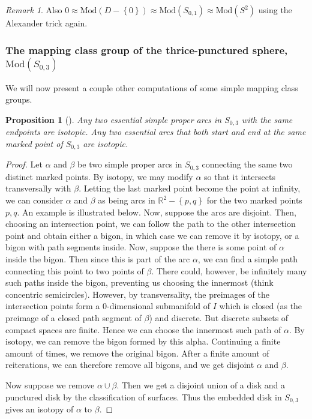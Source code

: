 \documentclass[reqno]{amsart}
\newtheorem{proposition}[theorem]{Proposition}
\theoremstyle{definition}
\theoremstyle{remark}
\newtheorem*{remark}{Remark}
\newcommand{\Mod}{{\mathrm{Mod}}}
\begin{document}
\begin{remark}
    Also $0 \approx \Mod\left( D - \left\{ 0 \right\}  \right) 
    \approx \Mod \left( S_{0,1} \right) \approx
    \Mod\left( S^2 \right) $ using the Alexander trick again.
\end{remark}

\subsubsection{The mapping class group of the thrice-punctured sphere,
$\Mod \left( S_{0,3} \right) $}


We will now present a couple other computations of
some simple mapping class groups.

\begin{proposition}[]\label{prop2.2}
    Any two essential simple proper arcs in $S_{0,3}$ with the
    same endpoints are isotopic. Any two essential arcs that both
    start and end at the same marked point of $S_{0,3}$ are isotopic.
\end{proposition}

\begin{proof}
    Let $\alpha$ and $\beta$ be two simple proper arcs in
    $S_{0,3}$ connecting the same two distinct marked points.
    By isotopy, we may modify $\alpha$ so that
    it intersects transversally with $\beta$.
    Letting the last marked point become the point at infinity,
    we can consider $\alpha$ and $\beta$ as being
    arcs in $\mathbb{R}^2 - \left\{ p,q \right\} $ for
    the two marked points $p,q$.
    An example is illustrated below.
    Now, suppose the arcs are disjoint.
    Then, choosing an intersection point, we can follow
    the path to the other intersection point and obtain
    either a bigon, in which case we can remove it by isotopy,
    or a bigon with path segments inside.
    Now, suppose
    the there is some point of $\alpha$ inside the bigon.
    Then since this is part of the arc $\alpha$, we can find
    a simple path connecting this point to two points
    of $\beta$. There could, however, be infinitely many
    such paths inside the bigon, preventing us choosing the
    innermost (think concentric semicircles).
    However, by transversality, the preimages of the 
    intersection points
    form a $0$-dimensional submanifold of $I$ which is closed
    (as the preimage of a closed path segment of $ \beta$)
    and discrete.
    But discrete subsets of compact spaces are finite. Hence
    we can choose the innermost such path of $ \alpha$.
    By isotopy, we can remove the bigon formed by  this alpha.
    Continuing a finite amount of times, we remove the original
    bigon. After a finite amount of reiterations, we can
    therefore remove all bigons, and we get
    disjoint $ \alpha$ and $\beta$.

    Now suppose we remove $\alpha \cup  \beta$. Then
    we get a disjoint union of a disk and a punctured
    disk by the classification of surfaces.
    Thus the embedded disk in $S_{0,3}$ gives an isotopy
    of $\alpha$ to $\beta$.
\end{proof}
 
\end{document}
